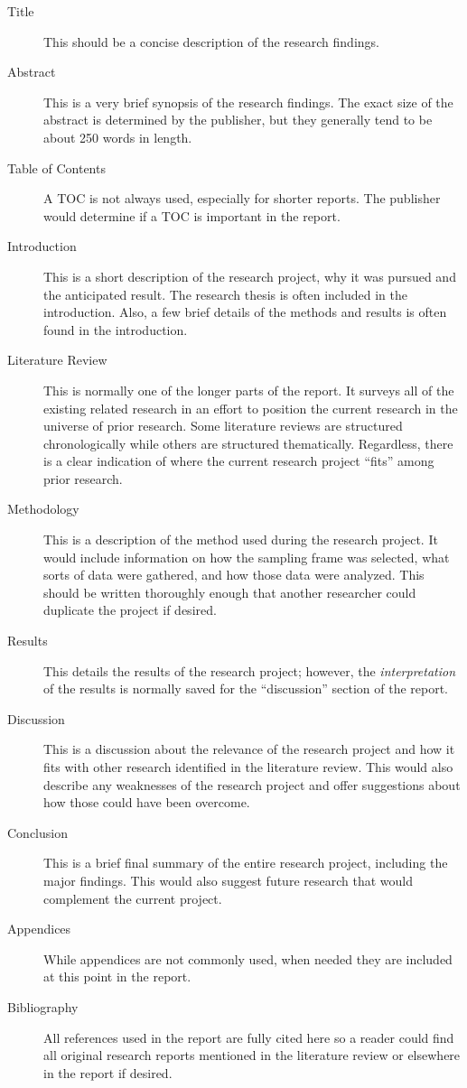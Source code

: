 \begin{description}
	\item[Title] This should be a concise description of the research findings.
	\item[Abstract] This is a very brief synopsis of the research findings. The exact size of the abstract is determined by the publisher, but they generally tend to be about 250 words in length.
	\item[Table of Contents] A TOC is not always used, especially for shorter reports. The publisher would determine if a TOC is important in the report.
	\item[Introduction]	This is a short description of the research project, why it was pursued and the anticipated result. The research thesis is often included in the introduction. Also, a few brief details of the methods and results is often found in the introduction.
	\item[Literature Review] This is normally one of the longer parts of the report. It surveys all of the existing related research in an effort to position the current research in the universe of prior research. Some literature reviews are structured chronologically while others are structured thematically. Regardless, there is a clear indication of where the current research project ``fits'' among prior research.
	\item[Methodology] This is a description of the method used during the research project. It would include information on how the sampling frame was selected, what sorts of data were gathered, and how those data were analyzed. This should be written thoroughly enough that another researcher could duplicate the project if desired.
	\item[Results] This details the results of the research project; however, the \textit{interpretation} of the results is normally saved for the ``discussion'' section of the report.
	\item[Discussion] This is a discussion about the relevance of the research project and how it fits with other research identified in the literature review. This would also describe any weaknesses of the research project and offer suggestions about how those could have been overcome.
	\item[Conclusion] This is a brief final summary of the entire research project, including the major findings. This would also suggest future research that would complement the current project.
	\item[Appendices] While appendices are not commonly used, when needed they are included at this point in the report.
	\item[Bibliography] All references used in the report are fully cited here so a reader could find all original research reports mentioned in the literature review or elsewhere in the report if desired.
\end{description}

